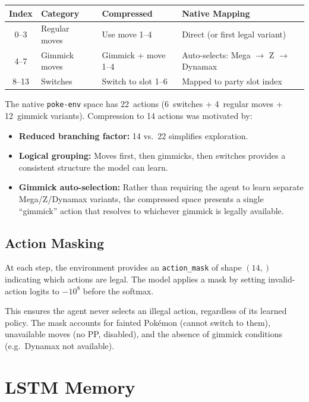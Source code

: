 \begin{center}
\small
\begin{tabularx}{\textwidth}{c l l l}
  \toprule
  \textbf{Index} & \textbf{Category} & \textbf{Compressed} & \textbf{Native Mapping} \\
  \midrule
  0--3  & Regular moves & Use move 1--4    & Direct (or first legal variant) \\
  4--7  & Gimmick moves & Gimmick + move 1--4 & Auto-selects: Mega $\to$ Z $\to$ Dynamax \\
  8--13 & Switches      & Switch to slot 1--6 & Mapped to party slot index \\
  \bottomrule
\end{tabularx}
\end{center}

The native \texttt{poke-env} space has 22~actions (6~switches + 4~regular
moves + 12~gimmick variants).  Compression to 14 actions was motivated by:

\begin{itemize}
  \item \textbf{Reduced branching factor:} 14 vs.\ 22 simplifies exploration.
  \item \textbf{Logical grouping:} Moves first, then gimmicks, then switches
        provides a consistent structure the model can learn.
  \item \textbf{Gimmick auto-selection:} Rather than requiring the agent to
        learn separate Mega/Z/Dynamax variants, the compressed space presents
        a single ``gimmick'' action that resolves to whichever gimmick is
        legally available.
\end{itemize}

\subsection{Action Masking}

At each step, the environment provides an \texttt{action\_mask} of shape
$(14,)$ indicating which actions are legal.  The model applies a mask by
setting invalid-action logits to $-10^{8}$ before the softmax.

This ensures the agent never selects an illegal action, regardless of its
learned policy.  The mask accounts for fainted Pok\'{e}mon (cannot switch to
them), unavailable moves (no PP, disabled), and the absence of gimmick
conditions (e.g.\ Dynamax not available).

\section{LSTM Memory}

